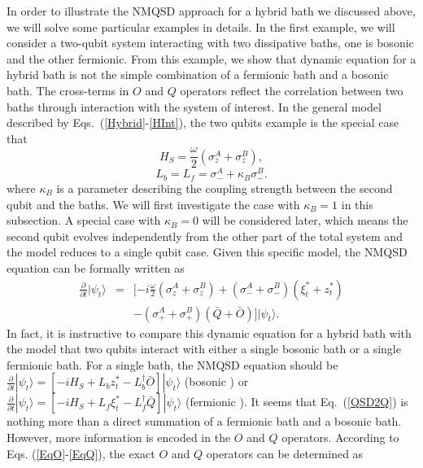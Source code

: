 \documentclass[preprint]{elsarticle}
\begin{document}
In order to illustrate the NMQSD approach for a hybrid bath we discussed
above, we will solve some particular examples in details. In the first
example, we will consider a two-qubit system interacting with two dissipative
baths, one is bosonic and the other fermionic. From this example, we show that dynamic equation
 for a hybrid bath is not the simple combination of a fermionic bath and 
 a bosonic bath. The cross-terms in $O$ and $Q$ operators reflect the correlation between two baths
 through interaction with the system of interest. In the
general model described by Eqs.~(\ref{Hybrid}-\ref{HInt}),
the two qubits example is the special case that 
\begin{equation}
H_{S}=\frac{\omega}{2}(\sigma_{z}^{A}+\sigma_{z}^{B}),
\end{equation}
\begin{equation}
L_{b}=L_{f}=\sigma_{-}^{A}+\kappa_{B}\sigma_{-}^{B}.\label{L2qu}
\end{equation}
where $\kappa_{B}$ is a parameter describing the coupling strength
between the second qubit and the baths. We will first investigate
the case with $\kappa_{B}=1$ in this subsection.  A special case with $\kappa_{B}=0$ will be considered
later, which means the second qubit evolves independently from the
other part of the total system and the model reduces to a single qubit case. Given this
specific model, the NMQSD equation can be formally written as
\begin{eqnarray}
\frac{\partial}{\partial t}|\psi_{t}\rangle & = & [-i\frac{\omega}{2}(\sigma_{z}^{A}+\sigma_{z}^{B})+(\sigma_{-}^{A}+\sigma_{-}^{B})(\xi_{t}^{\ast}+z_{t}^{*})\nonumber \\
 &  & -(\sigma_{+}^{A}+\sigma_{+}^{B})(\bar{Q}+\bar{O})]|\psi_{t}\rangle. \label{QSD2Q}
\end{eqnarray}
In fact, it is instructive to compare this dynamic equation for a hybrid bath with the model that two qubits interact with either a single bosonic bath or a single fermionic bath. For a single bath, the NMQSD equation should be
$\frac{\partial}{\partial t}|\psi_t\rangle=[-iH_S+L_b z_t^\ast-L_b^\dagger\bar{O}]|\psi_t\rangle$ (bosonic \cite{Xinyu2011}) or
$\frac{\partial}{\partial t}|\psi_t\rangle=[-iH_S+L_f \xi_t^\ast-L_f^\dagger\bar{Q}]|\psi_t\rangle$ (fermionic \cite{ZhaoFB}). It seems that Eq.~(\ref{QSD2Q}) is nothing more than a direct summation of a fermionic bath and a bosonic bath. However, more information is encoded in the $O$ and $Q$ operators. According to Eqs. (\ref{EqO}-\ref{EqQ}), the exact $O$ and $Q$ operators can be determined as
\end{document}
